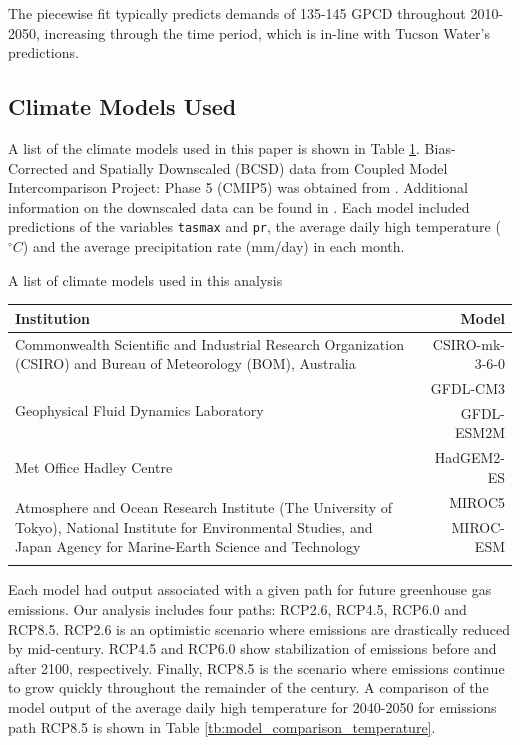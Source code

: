 \documentclass[opre,nonblindrev]{informs3} %
\begin{document}
The piecewise fit typically predicts demands of 135-145 GPCD throughout 2010-2050, increasing through the time period, which is in-line with Tucson Water's predictions.

\subsection{Climate Models Used}

A list of the climate models used in this paper is shown in Table \ref{tb:climate_models}.
Bias-Corrected and Spatially Downscaled (BCSD) data from Coupled Model Intercomparison Project: Phase 5 (CMIP5) was obtained from \citep{cmip5}.
Additional information on the downscaled data can be found in \citep{bcsdreclamation}.
Each model included predictions of the variables \texttt{tasmax} and \texttt{pr}, the average daily high temperature ($^\circ C$) and the average precipitation rate (mm/day) in each month.

\begin{table}
	\TABLE
	{
		A list of climate models used in this analysis
		\label{tb:climate_models}
	}
	{\begin{tabular}{p{}|r}
		\hline
		Institution & Model \\
		\hline
		\hline
		Commonwealth Scientific and Industrial Research Organization (CSIRO) and Bureau of Meteorology (BOM), Australia & CSIRO-mk-3-6-0 \\
		\hline
		\multirow{2}{*}{Geophysical Fluid Dynamics Laboratory} & GFDL-CM3 \\
		 & GFDL-ESM2M \\
		\hline
		Met Office Hadley Centre & HadGEM2-ES \\
		\hline
		\multirow{3}{*}{\vbox{Atmosphere and Ocean Research Institute (The University of Tokyo), National Institute for Environmental Studies, and Japan Agency for Marine-Earth Science and Technology}}  & MIROC5 \\
		 & MIROC-ESM \\
		 & \\
		\hline
	\end{tabular}}
	{}
\end{table}

Each model had output associated with a given path for future greenhouse gas emissions.
Our analysis includes four paths: RCP2.6, RCP4.5, RCP6.0 and RCP8.5.
RCP2.6 is an optimistic scenario where emissions are drastically reduced by mid-century.
RCP4.5 and RCP6.0 show stabilization of emissions before and after 2100, respectively.
Finally, RCP8.5 is the scenario where emissions continue to grow quickly throughout the remainder of the century.
A comparison of the model output of the average daily high temperature for 2040-2050 for emissions path RCP8.5 is shown in Table \ref{tb:model_comparison_temperature}.
\end{document}
